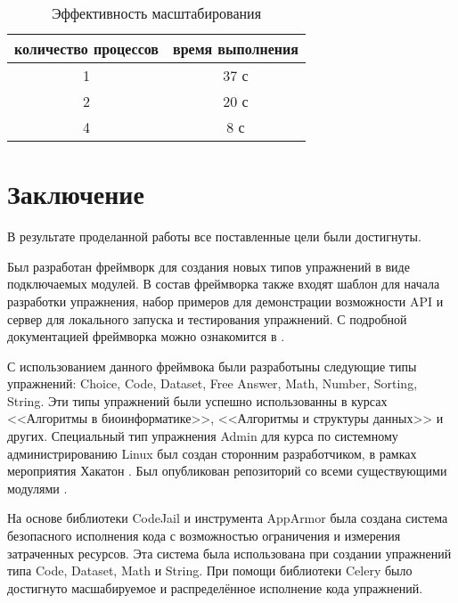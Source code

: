 \documentclass{matmex-diploma-custom}
\begin{document}
\begin{table}[h]
  \centering
\begin{tabular}{|c|c|}
  \hline
  количество процессов & время выполнения \\
  \hline
  1 & 37 с \\
  2 & 20 с \\
  4 & 8 с \\
  \hline
\end{tabular}
  \caption{Эффективность масштабирования}
  \label{table:scal}
\end{table}

\iffalse
#+ORGTBL: SEND scal orgtbl-to-latex :splice nil :skip 0
|----------------------+------------------|
| количество процессов | время выполнения |
|----------------------+------------------|
|                    1 | 37 с             |
|                    2 | 20 с             |
|                    4 | 8 с              |
|----------------------+------------------|
\fi


\section*{Заключение}
В результате проделанной работы все поставленные цели были достигнуты.

Был разработан фреймворк для создания новых типов упражнений в виде
подключаемых модулей. В состав фреймворка также входят шаблон для
начала разработки упражнения, набор примеров для демонстрации
возможности API и сервер для локального запуска и тестирования
упражнений. С подробной документацией фреймворка можно ознакомится в
\cite{plugins:doc}.

С использованием данного фреймвока были разработыны следующие типы
упражнений: Choice, Code, Dataset, Free Answer, Math, Number, Sorting,
String. Эти типы упражнений были успешно использованны в курсах
<<Алгоритмы в биоинформатике>>, <<Алгоритмы и структуры данных>> и
других. Специальный тип упражнения Admin для курса по системному
администрированию Linux был создан сторонним разработчиком, в рамках
мероприятия Хакатон \cite{hackathon}. Был опубликован репозиторий со
всеми существующими модулями \cite{plugins:repo}.

На основе библиотеки CodeJail и инструмента AppArmor была создана
система безопасного исполнения кода с возможностью ограничения и
измерения затраченных ресурсов. Эта система была использована при
создании упражнений типа Code, Dataset, Math и String. При помощи
библиотеки Celery было достигнуто масшабируемое и распределённое
исполнение кода упражнений.

\clearpage
{}


\end{document}
